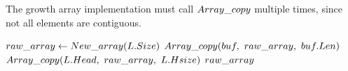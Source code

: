 \HdrGrowthArrayImpl

The growth array implementation must call $Array\_copy$ multiple times, since not all elements are contiguous.

\begin{algorithm}
	\begin{algorithmic}
		\Function{$\FuncToArray$}{$\VarList$}
		\State $raw\_array \gets New\_array(L.Size)$
			\State $\FuncArrayCopy(\LclBuffer,\ \LclRawArray,\ \LclBuffer.\FieldLength)$
		\EndFor
		\State $\FuncArrayCopy(\VarList.\FieldHead,\ \LclRawArray,\ \VarList.\FieldHeadSize)$
		\State \Return $raw\_array$
		\EndFunction
	\end{algorithmic}
\end{algorithm}